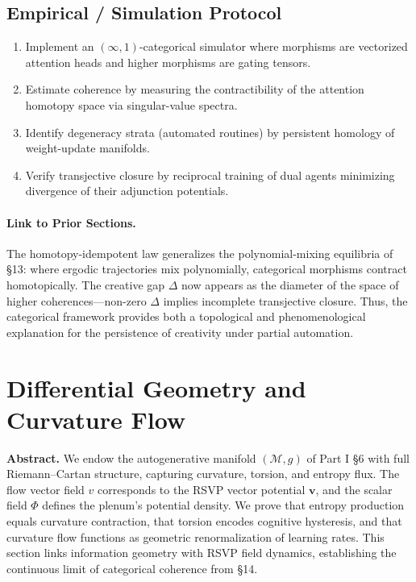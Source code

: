 \documentclass[12pt,a4paper,twoside,openright]{book}
\begin{document}
\subsection*{Empirical / Simulation Protocol}
\begin{enumerate}
\item Implement an $(\infty,1)$-categorical simulator where morphisms are vectorized attention heads and higher morphisms are gating tensors.
\item Estimate coherence by measuring the contractibility of the attention homotopy space via singular-value spectra.
\item Identify degeneracy strata (automated routines) by persistent homology of weight-update manifolds.
\item Verify transjective closure by reciprocal training of dual agents minimizing divergence of their adjunction potentials.
\end{enumerate}

\paragraph{Link to Prior Sections.}
The homotopy-idempotent law generalizes the polynomial-mixing equilibria of §13:
where ergodic trajectories mix polynomially, categorical morphisms contract homotopically.
The creative gap $\Delta$ now appears as the diameter of the space of higher coherences—non-zero $\Delta$ implies incomplete transjective closure.
Thus, the categorical framework provides both a topological and phenomenological explanation for the persistence of creativity under partial automation.




\section{Differential Geometry and Curvature Flow}
\label{sec:geometry}

\textbf{Abstract.}
We endow the autogenerative manifold $(\mathcal{M},g)$ of Part I §6 with full Riemann–Cartan structure, capturing curvature, torsion, and entropy flux.  
The flow vector field $v$ corresponds to the RSVP vector potential $\mathbf{v}$, and the scalar field $\Phi$ defines the plenum’s potential density.  
We prove that entropy production equals curvature contraction, that torsion encodes cognitive hysteresis, and that curvature flow functions as geometric renormalization of learning rates.  
This section links information geometry with RSVP field dynamics, establishing the continuous limit of categorical coherence from §14.
\end{document}
